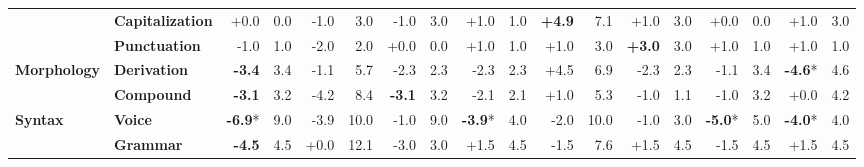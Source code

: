 \begin{table}[h]
{\begin{tabular}{llrrrrrrrrrrrrrrrr}
  & \textbf{Capitalization} & \cellcolor{red!0} +0.0 & \cellcolor{blue!0} 0.0 & \cellcolor{red!1} -1.0 & \cellcolor{blue!2} 3.0 & \cellcolor{red!1} -1.0 & \cellcolor{blue!2} 3.0 & \cellcolor{green!1} +1.0 & \cellcolor{blue!0} 1.0 & \cellcolor{green!9} \textbf{+4.9} & \cellcolor{blue!5} 7.1 & \cellcolor{green!2} +1.0 & \cellcolor{blue!2} 3.0 & \cellcolor{red!0} +0.0 & \cellcolor{blue!0} 0.0 & \cellcolor{green!1} +1.0 & \cellcolor{blue!2} 3.0 \\
  & \textbf{Punctuation} & \cellcolor{red!1} -1.0 & \cellcolor{blue!0} 1.0 & \cellcolor{red!3} -2.0 & \cellcolor{blue!1} 2.0 & \cellcolor{red!0} +0.0 & \cellcolor{blue!0} 0.0 & \cellcolor{green!1} +1.0 & \cellcolor{blue!0} 1.0 & \cellcolor{green!1} +1.0 & \cellcolor{blue!2} 3.0 & \cellcolor{green!5} \textbf{+3.0} & \cellcolor{blue!2} 3.0 & \cellcolor{green!1} +1.0 & \cellcolor{blue!0} 1.0 & \cellcolor{green!1} +1.0 & \cellcolor{blue!0} 1.0 \\
\midrule
\textbf{Morphology} & \textbf{Derivation} & \cellcolor{red!6} \textbf{-3.4} & \cellcolor{blue!2} 3.4 & \cellcolor{red!2} -1.1 & \cellcolor{blue!4} 5.7 & \cellcolor{red!4} -2.3 & \cellcolor{blue!1} 2.3 & \cellcolor{red!4} -2.3 & \cellcolor{blue!1} 2.3 & \cellcolor{green!9} +4.5 & \cellcolor{blue!5} 6.9 & \cellcolor{red!4} -2.3 & \cellcolor{blue!1} 2.3 & \cellcolor{red!2} -1.1 & \cellcolor{blue!2} 3.4 & \cellcolor{red!9} \textbf{-4.6}* & \cellcolor{blue!3} 4.6 \\
  & \textbf{Compound} & \cellcolor{red!6} \textbf{-3.1} & \cellcolor{blue!2} 3.2 & \cellcolor{red!8} -4.2 & \cellcolor{blue!6} 8.4 & \cellcolor{red!6} \textbf{-3.1} & \cellcolor{blue!2} 3.2 & \cellcolor{red!4} -2.1 & \cellcolor{blue!1} 2.1 & \cellcolor{green!2} +1.0 & \cellcolor{blue!4} 5.3 & \cellcolor{red!2} -1.0 & \cellcolor{blue!0} 1.1 & \cellcolor{red!2} -1.0 & \cellcolor{blue!2} 3.2 & \cellcolor{red!0} +0.0 & \cellcolor{blue!3} 4.2 \\
\midrule
\textbf{Syntax} & \textbf{Voice} & \cellcolor{red!13} \textbf{-6.9}* & \cellcolor{blue!7} 9.0 & \cellcolor{red!7} -3.9 & \cellcolor{blue!8} 10.0 & \cellcolor{red!1} -1.0 & \cellcolor{blue!7} 9.0 & \cellcolor{red!7} \textbf{-3.9}* & \cellcolor{blue!3} 4.0 & \cellcolor{red!3} -2.0 & \cellcolor{blue!8} 10.0 & \cellcolor{red!1} -1.0 & \cellcolor{blue!2} 3.0 & \cellcolor{red!9} \textbf{-5.0}* & \cellcolor{blue!4} 5.0 & \cellcolor{red!7} \textbf{-4.0}* & \cellcolor{blue!3} 4.0 \\
  & \textbf{Grammar} & \cellcolor{red!8} \textbf{-4.5} & \cellcolor{blue!3} 4.5 & \cellcolor{red!0} +0.0 & \cellcolor{blue!9} 12.1 & \cellcolor{red!5} -3.0 & \cellcolor{blue!2} 3.0 & \cellcolor{green!2} +1.5 & \cellcolor{blue!3} 4.5 & \cellcolor{red!2} -1.5 & \cellcolor{blue!6} 7.6 & \cellcolor{green!2} +1.5 & \cellcolor{blue!3} 4.5 & \cellcolor{red!2} -1.5 & \cellcolor{blue!3} 4.5 & \cellcolor{green!2} +1.5 & \cellcolor{blue!3} 4.5 \\

\end{tabular}}
\end{table}
